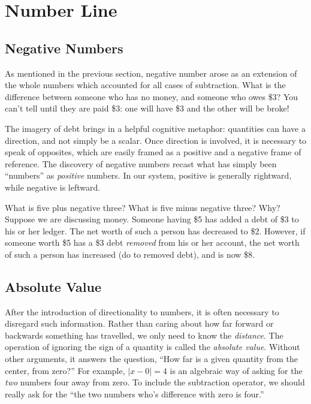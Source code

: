 
\section{Number Line}\label{sec:NumberLine}



\subsection{Negative Numbers}
As mentioned in the previous section, negative number arose as an extension of the whole 
numbers which accounted for all cases of subtraction.  What is the difference between
someone who has no money, and someone who owes \$3?  You can't tell until they are
paid \$3: one will have \$3 and the other will be broke!  

The imagery of debt brings in a helpful cognitive metaphor: quantities can have a direction, 
and not simply be a \gls{scalar}.  Once direction is involved, it is necessary to speak of 
opposites, which are easily framed as a positive and a negative frame of reference.  The
discovery of negative numbers recast what has simply been ``numbers'' as \emph{positive}
numbers.  In our system, positive is generally rightward, while negative is leftward.

\begin{example}
	\exProblem
What is five plus negative three?  What is five minus negative three?  Why?
	\exSolution
Suppose we are discussing money.  Someone having \$5 has added a debt of \$3 to his
or her ledger.  The net worth of such a person has decreased to \$2.  However, if someone
worth \$5 has a \$3 debt \emph{removed} from his or her account, the net worth of such a
person has increased (do to removed debt), and is now \$8.
\end{example}

\subsection{Absolute Value}
After the introduction of directionality to numbers, it is often necessary to disregard such information.
Rather than caring about how far forward or backwards something has travelled, we only need to 
know the \emph{distance}.  The operation of ignoring the sign of a quantity is called the 
\emph{absolute value}.  Without other arguments, it answers the question, ``How far is a given
quantity from the center, from zero?''  For example, $|x-0| = 4$ is an algebraic way of asking for
the \emph{two} numbers four away from zero.  To include the subtraction operator, we should
really ask for the ``the two numbers who's difference with zero is four.''

